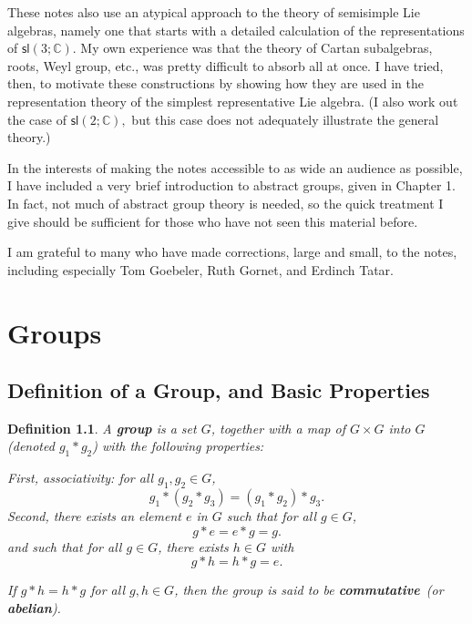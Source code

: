 \documentclass[12pt]{amsbook}
\theoremstyle{plain}
\newtheorem{definition}[theorem]{Definition}
\numberwithin{equation}{chapter}
\numberwithin{theorem}{chapter}
\begin{document}
These notes also use an atypical approach to the theory of semisimple Lie
algebras, namely one that starts with a detailed calculation of the
representations of $\mathsf{sl}(3;\mathbb{C})$. My own experience was that the
theory of Cartan subalgebras, roots, Weyl group, etc., was pretty difficult to
absorb all at once. I have tried, then, to motivate these constructions by
showing how they are used in the representation theory of the simplest
representative Lie algebra. (I also work out the case of $\mathsf{sl}%
(2;\mathbb{C}),$ but this case does not adequately illustrate the general theory.)

In the interests of making the notes accessible to as wide an audience as
possible, I have included a very brief introduction to abstract groups, given
in Chapter 1. In fact, not much of abstract group theory is needed, so the
quick treatment I give should be sufficient for those who have not seen this
material before.

I am grateful to many who have made corrections, large and small, to the
notes, including especially Tom Goebeler, Ruth Gornet, and Erdinch Tatar.

\mainmatter

\chapter{Groups}

\section{Definition of a Group, and Basic Properties}

\begin{definition}
A \textbf{group} is a set $G$, together with a map of $G\times G$ into $G$
(denoted $g_{1}\ast g_{2}$) with the following properties:

First, associativity: for all $g_{1},g_{2}\in G$,
\begin{equation}
g_{1}\ast(g_{2}\ast g_{3})=(g_{1}\ast g_{2})\ast g_{3}\text{.}%
\label{Associativity}%
\end{equation}
Second, there exists an element $e$ in $G$ such that for all $g\in G$,
\begin{equation}
g\ast e=e\ast g=g\text{.}\label{Identity}%
\end{equation}
and such that for all $g\in G$, there exists $h\in G$ with
\begin{equation}
g\ast h=h\ast g=e\text{.}\label{Inverses}%
\end{equation}

If $g\ast h=h\ast g$ for all $g,h\in G$, then the group is said to be
\textbf{commutative}\emph{\ }(or \textbf{abelian}).
\end{definition}
\end{document}
